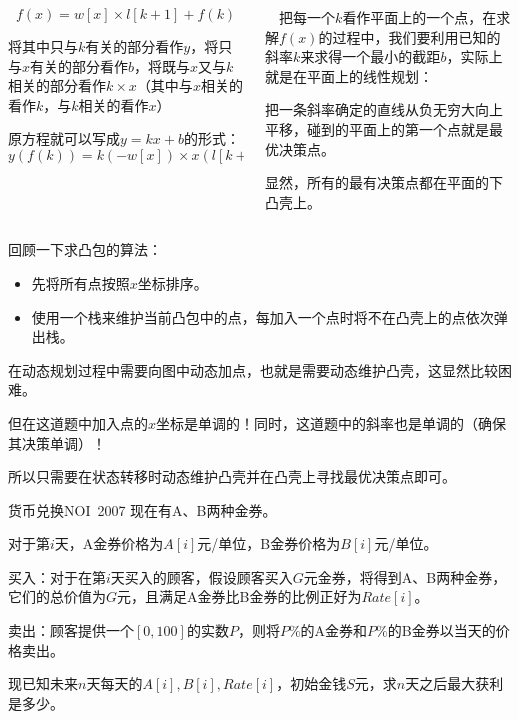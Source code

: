\documentclass[9pt,dvipsnames,table,UTF8,aspectratio=169]{beamer}
\begin{document}
\begin{frame}
	\begin{columns}
		\begin{column}{0.5\textwidth}
			$$f(x) = w[x] \times l[k + 1] + f(k)$$

			将其中只与$k$有关的部分看作$y$，将只与$x$有关的部分看作$b$，将既与$x$又与$k$相关的部分看作$k \times x$（其中与$x$相关的看作$k$，与$k$相关的看作$x$）

			原方程就可以写成$y = kx + b$的形式：$$y(f(k)) = k(-w[x]) \times x(l[k + 1]) + b(f(x))$$
		\end{column}
		\begin{column}{0.5\textwidth}
			　把每一个$k$看作平面上的一个点，在求解$f(x)$的过程中，我们要利用已知的斜率$k$来求得一个最小的截距$b$，实际上就是在平面上的线性规划：

			把一条斜率确定的直线从负无穷大向上平移，碰到的平面上的第一个点就是最优决策点。

			显然，所有的最有决策点都在平面的下凸壳上。
		\end{column}
	\end{columns}
\end{frame}

\begin{frame}
	回顾一下求凸包的算法：
	\begin{itemize}
		\item 先将所有点按照$x$坐标排序。
		\item 使用一个栈来维护当前凸包中的点，每加入一个点时将不在凸壳上的点依次弹出栈。
	\end{itemize}

	\pause
	在动态规划过程中需要向图中动态加点，也就是需要动态维护凸壳，这显然比较困难。

	\pause
	但在这道题中加入点的$x$坐标是单调的！同时，这道题中的斜率也是单调的（确保其决策单调）！

	\pause
	所以只需要在状态转移时动态维护凸壳并在凸壳上寻找最优决策点即可。
\end{frame}

\begin{frame}{货币兑换}{NOI\ 2007}
       现在有A、B两种金券。

       对于第$i$天，A金券价格为$A[i]$元/单位，B金券价格为$B[i]$元/单位。
       
       买入：对于在第$i$天买入的顾客，假设顾客买入$G$元金券，将得到A、B两种金券，它们的总价值为$G$元，且满足A金券比B金券的比例正好为$Rate[i]$。
       
       卖出：顾客提供一个$[0,100]$的实数$P$，则将$P\%$的A金券和$P\%$的B金券以当天的价格卖出。
       
       现已知未来$n$天每天的$A[i],B[i],Rate[i]$，初始金钱$S$元，求$n$天之后最大获利是多少。
\end{frame}
\end{document}
